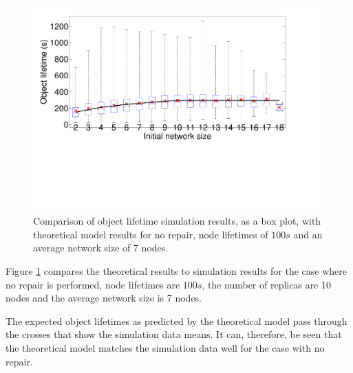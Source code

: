 \documentclass[10pt,a4paper,conference]{IEEEtran}
\begin{document}
\begin{figure}[htbp]
 \centering
 \includegraphics[clip=true, viewport=0.5cm 7.0cm 26.0cm 20.0cm, width=\columnwidth]{lifetime_simulation_model_none_100}
 \caption{Comparison of object lifetime simulation results, as a box plot, with theoretical model results for no repair, node lifetimes of $100 s$ and an average network size of 7 nodes.}
 \label{fig_lifetime_simulation_model_none_100}
\end{figure}
%
Figure \ref{fig_lifetime_simulation_model_none_100} compares the theoretical results to simulation results for the case where no repair is performed, node lifetimes are $100 s$, the number of replicas are 10 nodes and the average network size is 7 nodes.

The expected object lifetimes as predicted by the theoretical model pass through the crosses that show the simulation data means. It can, therefore, be seen that the theoretical model matches the simulation data well for the case with no repair.
\end{document}
